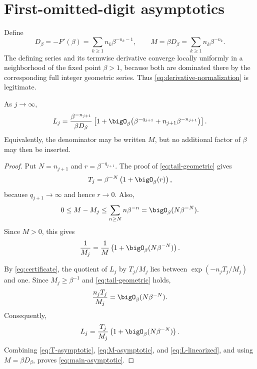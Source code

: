 \section{First-omitted-digit asymptotics}
\label{sec:asymptotics}

Define
\begin{equation}
 D_\beta=-F'(\beta)=\sum_{k\geq1}n_k\beta^{-n_k-1},
 \qquad
 M=\beta D_\beta=\sum_{k\geq1}n_k\beta^{-n_k}.
 \label{eq:derivative-normalization}
\end{equation}
The defining series and its termwise derivative converge locally uniformly in a neighborhood of the fixed point $\beta>1$, because both are dominated there by the corresponding full integer geometric series.  Thus \eqref{eq:derivative-normalization} is legitimate.

\begin{theorem}
\label{thm:asymptotic}
As $j\to\infty$,
\begin{equation}
 L_j=
 \frac{\beta^{-n_{j+1}}}{\beta D_\beta}
 \left[
 1+\bigO_\beta\!\left(
 \beta^{-q_{j+1}}+n_{j+1}\beta^{-n_{j+1}}
 \right)
 \right].
 \label{eq:main-asymptotic}
\end{equation}
Equivalently, the denominator may be written $M$, but no additional factor of $\beta$ may then be inserted.
\end{theorem}

\begin{proof}
Put $N=n_{j+1}$ and $r=\beta^{-q_{j+1}}$.  The proof of \eqref{eq:tail-geometric} gives
\begin{equation}
 T_j=\beta^{-N}\left(1+\bigO_\beta(r)\right),
 \label{eq:T-asymptotic}
\end{equation}
because $q_{j+1}\to\infty$ and hence $r\to0$.  Also,
\[
 0\leq M-M_j
 \leq\sum_{n\geq N}n\beta^{-n}
 =\bigO_\beta(N\beta^{-N}).
\]
Since $M>0$, this gives
\begin{equation}
 \frac{1}{M_j}=\frac{1}{M}
 \left(1+\bigO_\beta(N\beta^{-N})\right).
 \label{eq:M-asymptotic}
\end{equation}

By \eqref{eq:certificate}, the quotient of $L_j$ by $T_j/M_j$ lies between
$\exp(-n_jT_j/M_j)$ and one.  Since $M_j\geq\beta^{-1}$ and \eqref{eq:tail-geometric} holds,
\[
 \frac{n_jT_j}{M_j}=\bigO_\beta(N\beta^{-N}).
\]
Consequently,
\begin{equation}
 L_j=\frac{T_j}{M_j}
 \left(1+\bigO_\beta(N\beta^{-N})\right).
 \label{eq:L-linearized}
\end{equation}
Combining \eqref{eq:T-asymptotic}, \eqref{eq:M-asymptotic}, and \eqref{eq:L-linearized}, and using $M=\beta D_\beta$, proves \eqref{eq:main-asymptotic}.
\end{proof}

